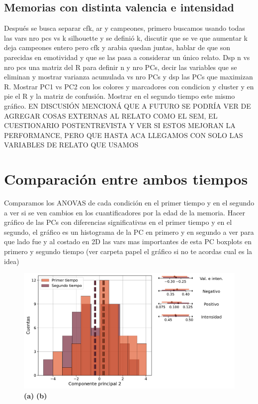 \subsection{Memorias con distinta valencia e intensidad}
\label{sec:PCscamparCFK}
Después se busca separar cfk, ar y campeones, primero buscamos usando todas las vars nro pcs vs k silhouette y se definió k, discutir que se ve que aumentar k deja campeones entero pero cfk y arabia quedan juntas, hablar de que son parecidas en emotividad y que se las pasa a considerar un único relato. Dsp  n vs nro pcs una matriz del R para definir n y nro PCs, decir las variables que se eliminan y mostrar varianza acumulada vs nro PCs y dsp las PCs que maximizan R. Mostrar PC1 vs PC2 con los colores y marcadores con condicion y cluster y en pie el R y la matriz de confusión. Mostrar en el segundo tiempo este mismo gráfico.
EN DISCUSIÓN MENCIONÁ QUE A FUTURO SE PODRÍA VER DE AGREGAR COSAS EXTERNAS AL RELATO COMO EL SEM, EL CUESTIONARIO POSTENTREVISTA Y VER SI ESTOS MEJORAN LA PERFORMANCE, PERO QUE HASTA ACA LLEGAMOS CON SOLO LAS VARIABLES DE RELATO QUE USAMOS

\section{Comparación entre ambos tiempos}
Comparamos los ANOVAS de cada condición en el primer tiempo y en el segundo a ver si se ven cambios en los cuantificadores por la edad de la memoria. Hacer gráfico de las PCs con diferencias significativas en el primer tiempo y en el segundo, el gráfico es un histograma de la PC en primero y en segundo a ver para que lado fue y al costado en 2D las vars mas importantes de esta PC boxplots en primero y segundo tiempo (ver carpeta papel el gráfico si no te acordas cual es la idea)

\begin{figure}[h]
    \centering
    \includegraphics[width = 14cm]{figures/ch03/DosTiempos/arabia_PC2.pdf} 
    \caption{\textbf{(a)}  \textbf{(b)}}
\label{fig:cap3_cysruido_decaimiento_mt}
\end{figure}

